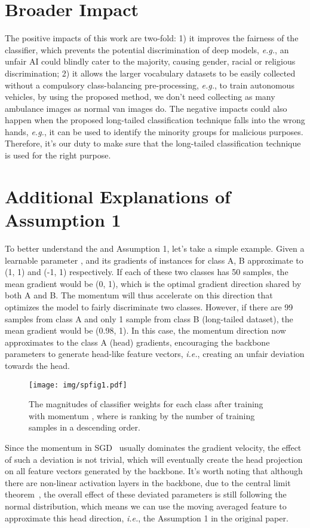 \documentclass{article}
\newcommand{\ie}{\textit{i.e.}}
\newcommand{\eg}{\textit{e.g.}}
\begin{document}
\section*{Broader Impact}

The positive impacts of this work are two-fold: 1) it improves the fairness of the classifier, which prevents the potential discrimination of deep models, \eg, an unfair AI could blindly cater to the majority, causing gender, racial or religious discrimination; 2) it allows the larger vocabulary datasets to be easily collected without a compulsory class-balancing pre-processing, \eg, to train autonomous vehicles, by using the proposed method, we don't need collecting as many ambulance images as normal van images do.  The negative impacts could also happen when the proposed long-tailed classification technique falls into the wrong hands, \eg, it can be used to identify the minority groups for malicious purposes. Therefore, it's our duty to make sure that the long-tailed classification technique is used for the right purpose.



\appendix

\section{Additional Explanations of Assumption 1}
\label{sp-sec:assumption1}
To better understand the  and Assumption 1, let's take a simple example. Given a learnable parameter , and its gradients of instances for class A, B approximate to (1, 1) and (-1, 1) respectively. If each of these two classes has 50 samples, the mean gradient would be  (0, 1), which is the optimal gradient direction shared by both A and B. The momentum will thus accelerate on this direction that optimizes the model to fairly discriminate two classes. However, if there are 99 samples from class A and only 1 sample from class B (long-tailed dataset), the mean gradient would be (0.98, 1). In this case, the momentum direction now approximates to the class A (head) gradients, encouraging the backbone parameters to generate head-like feature vectors, \ie, creating an unfair deviation towards the head. 

\begin{wrapfigure}{r}{6cm}
   \texttt{[image: img/spfig1.pdf]}
   \caption{The magnitudes of classifier weights  for each class after training with momentum , where  is ranking by the number of training samples in a descending order.}
   \label{spfig:1} \end{wrapfigure}
Since the momentum in SGD~\cite{pytorchSGD, sutskever2013importance, qian1999momentum} usually dominates the gradient velocity, the effect of such a deviation is not trivial, which will eventually create the head projection  on all feature vectors generated by the backbone. It's worth noting that although there are non-linear activation layers in the backbone, due to the central limit theorem~\cite{montgomery2010applied}, the overall effect of these deviated parameters is still following the normal distribution, which means we can use the moving averaged feature to approximate this head direction, \ie, the Assumption 1 in the original paper.
\end{document}

